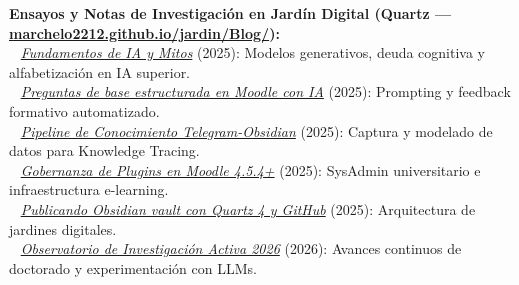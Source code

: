\documentclass[10pt,a4paper]{article}
\begin{document}
\vspace{4pt}

\textbf{Ensayos y Notas de Investigación en Jardín Digital (Quartz — \href{https://marchelo2212.github.io/jardin/Blog/}{marchelo2212.github.io/jardin/Blog/}):}\\
\textbullet~ \href{https://marchelo2212.github.io/jardin/Blog/2025/Fundamentos-de-IA-y-Mitos}{\textit{Fundamentos de IA y Mitos}} (2025): Modelos generativos, deuda cognitiva y alfabetización en IA superior.\\
\textbullet~ \href{https://marchelo2212.github.io/jardin/Blog/2025/Creaci\%C3\%B3n-de-preguntas-de-base-estructurada-para-Moodle-empleando-IA}{\textit{Preguntas de base estructurada en Moodle con IA}} (2025): Prompting y feedback formativo automatizado.\\
\textbullet~ \href{https://marchelo2212.github.io/jardin/Blog/2025/Automatizando-la-captura-de-informaci\%C3\%B3n-desde-Telegram-hacia-Obsidian-usando-hashtags}{\textit{Pipeline de Conocimiento Telegram-Obsidian}} (2025): Captura y modelado de datos para Knowledge Tracing.\\
\textbullet~ \href{https://marchelo2212.github.io/jardin/Blog/2025/Gu\%C3\%ADa-T\%C3\%A9cnica-Instalaci\%C3\%B3n-y-Desinstalaci\%C3\%B3n-de-Plugins-Oficiales-en-Moodle-4.5.4+}{\textit{Gobernanza de Plugins en Moodle 4.5.4+}} (2025): SysAdmin universitario e infraestructura e-learning.\\
\textbullet~ \href{https://marchelo2212.github.io/jardin/Blog/2025/Publicando-Obsidian-vault-con-Quartz-4-y-GitHub}{\textit{Publicando Obsidian vault con Quartz 4 y GitHub}} (2025): Arquitectura de jardines digitales.\\
\textbullet~ \href{https://marchelo2212.github.io/jardin/Blog/2026/}{\textit{Observatorio de Investigación Activa 2026}} (2026): Avances continuos de doctorado y experimentación con LLMs.

\vspace{5pt}

\end{document}
